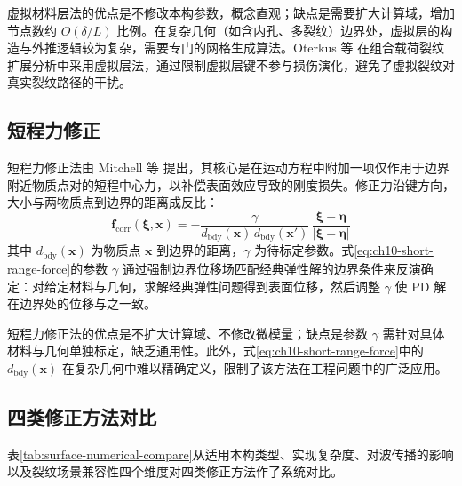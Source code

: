 虚拟材料层法的优点是不修改本构参数，概念直观；缺点是需要扩大计算域，增加节点数约 $O(\delta/L)$ 比例。在复杂几何（如含内孔、多裂纹）边界处，虚拟层的构造与外推逻辑较为复杂，需要专门的网格生成算法。Oterkus 等 \cite{Oterkus2012Combined} 在组合载荷裂纹扩展分析中采用虚拟层法，通过限制虚拟层键不参与损伤演化，避免了虚拟裂纹对真实裂纹路径的干扰。

\subsection{短程力修正}

短程力修正法由 Mitchell 等 \cite{Mitchell2015} 提出，其核心是在运动方程中附加一项仅作用于边界附近物质点对的短程中心力，以补偿表面效应导致的刚度损失。修正力沿键方向，大小与两物质点到边界的距离成反比：
\begin{equation}
\mathbf{f}_{\text{corr}}(\boldsymbol{\xi},\mathbf{x}) = -\frac{\gamma}{d_{\text{bdy}}(\mathbf{x})\,d_{\text{bdy}}(\mathbf{x}')}\,\frac{\boldsymbol{\xi}+\boldsymbol{\eta}}{|\boldsymbol{\xi}+\boldsymbol{\eta}|}
\label{eq:ch10-short-range-force}
\end{equation}
其中 $d_{\text{bdy}}(\mathbf{x})$ 为物质点 $\mathbf{x}$ 到边界的距离，$\gamma$ 为待标定参数。式\eqref{eq:ch10-short-range-force}的参数 $\gamma$ 通过强制边界位移场匹配经典弹性解的边界条件来反演确定：对给定材料与几何，求解经典弹性问题得到表面位移，然后调整 $\gamma$ 使 PD 解在边界处的位移与之一致。

短程力修正法的优点是不扩大计算域、不修改微模量；缺点是参数 $\gamma$ 需针对具体材料与几何单独标定，缺乏通用性。此外，式\eqref{eq:ch10-short-range-force}中的 $d_{\text{bdy}}(\mathbf{x})$ 在复杂几何中难以精确定义，限制了该方法在工程问题中的广泛应用。

\subsection{四类修正方法对比}

表\ref{tab:surface-numerical-compare}从适用本构类型、实现复杂度、对波传播的影响以及裂纹场景兼容性四个维度对四类修正方法作了系统对比。

